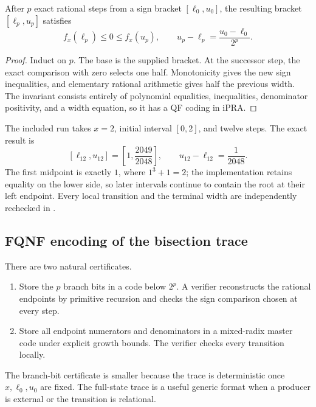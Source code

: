 \begin{theorem}
After \(p\) exact rational steps from a sign bracket \([\ell_0,u_0]\), the
resulting bracket \([\ell_p,u_p]\) satisfies
\[
 f_x(\ell_p)\le0\le f_x(u_p),
 \qquad
 u_p-\ell_p=\frac{u_0-\ell_0}{2^p}.
\]
\end{theorem}

\begin{proof}
Induct on \(p\).  The base is the supplied bracket.  At the successor step,
the exact comparison with zero selects one half.  Monotonicity gives the new
sign inequalities, and elementary rational arithmetic gives half the previous
width.  The invariant consists entirely of polynomial equalities,
inequalities, denominator positivity, and a width equation, so it has a QF
coding in iPRA.
\end{proof}

The included run takes \(x=2\), initial interval \([0,2]\), and twelve steps.
The exact result is
\[
  [\ell_{12},u_{12}]
   =\left[1,\frac{2049}{2048}\right],
  \qquad
  u_{12}-\ell_{12}=\frac1{2048}.
\]
The first midpoint is exactly \(1\), where \(1^3+1=2\); the implementation
retains equality on the lower side, so later intervals continue to contain the
root at their left endpoint.  Every local transition and the terminal width
are independently rechecked in
.

\subsection{FQNF encoding of the bisection trace}

There are two natural certificates.

\begin{enumerate}
\item Store the \(p\) branch bits in a code below \(2^p\).  A verifier
reconstructs the rational endpoints by primitive recursion and checks the sign
comparison chosen at every step.
\item Store all endpoint numerators and denominators in a mixed-radix master
code under explicit growth bounds.  The verifier checks every transition
locally.
\end{enumerate}

The branch-bit certificate is smaller because the trace is deterministic once
\(x,\ell_0,u_0\) are fixed.  The full-state trace is a useful generic format
when a producer is external or the transition is relational.

